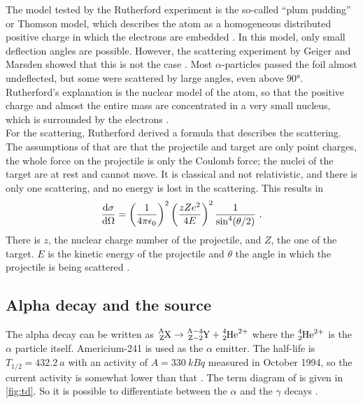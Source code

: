 The model tested by the Rutherford experiment is the so-called \enquote{plum pudding} or Thomson model, 
which describes the atom as a homogeneous distributed positive charge in which the electrons are embedded \cite{demtroeder3}.
In this model, only small deflection angles are possible.
However, the scattering experiment by Geiger and Marsden showed that this is not the case \cite{geiger1913}.
Most $\alpha$-particles passed the foil almost undeflected, but some were scattered by large angles, even above $90°$.
Rutherford's explanation is the nuclear model of the atom, so that
the positive charge and almost the entire mass are concentrated in a very small nucleus, which is surrounded by the electrons \cite{rutherford1911}.
\\
For the scattering, Rutherford derived a formula that describes the scattering. 
The assumptions of that are that the projectile and target are only point charges, the whole 
force on the projectile is only the Coulomb force; the nuclei of the target are at rest and cannot move. 
It is classical and not relativistic, and there is only one scattering, and no energy is lost in the scattering. 
This results in
\begin{equation}
    \label{eqn:rut}
    \frac{\text d \sigma}{\text d \Omega} = \left(\frac{1}{4\pi\epsilon_0} \right)^2\left(\frac{zZe^2}{4E} \right)^2\frac{1}{\sin^4(\theta/2)}\ .
\end{equation}
There is $z$, the nuclear charge number of the projectile, and $Z$, the one of the target. 
$E$ is the kinetic energy of the projectile and $\theta$ the angle in which the projectile is being scattered \cite{Povh1995}.

\subsection{Alpha decay and the \texorpdfstring{}{241Am} source}

The alpha decay can be written as $\ce{^A_ZX} \rightarrow \ce{^{A-4}_{Z-2}Y}+ \ce{^4_2He^{2+}}$ where the $\ce{^4_2He^{2+}}$ is the $\alpha$ particle itself.
Americium-241 is used as the $\alpha$ emitter.
The half-life is $T_{1/2}= \SI{432.2}{a}$ with an activity of $A = \SI{330}{kBq}$ measured in October 1994, so the current activity is somewhat lower than that \cite{Durchfuhrung}.
The term diagram of  is given in \autoref{fig:td}.
So it is possible to differentiate between the $\alpha$ and the $\gamma$ decays \cite{inproceedings}. 


